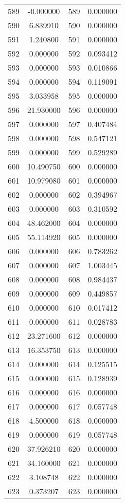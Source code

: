 \documentclass[12pt]{article}
\begin{document}
\begin{longtable}{@{}cccc@{}}
589 & -0.000000 & 589 & 0.000000 \\
590 & 6.839910 & 590 & 0.000000 \\
591 & 1.240800 & 591 & 0.000000 \\
592 & 0.000000 & 592 & 0.093412 \\
593 & 0.000000 & 593 & 0.010866 \\
594 & 0.000000 & 594 & 0.119091 \\
595 & 3.033958 & 595 & 0.000000 \\
596 & 21.930000 & 596 & 0.000000 \\
597 & 0.000000 & 597 & 0.407484 \\
598 & 0.000000 & 598 & 0.547121 \\
599 & 0.000000 & 599 & 0.529289 \\
600 & 10.490750 & 600 & 0.000000 \\
601 & 10.979080 & 601 & 0.000000 \\
602 & 0.000000 & 602 & 0.394967 \\
603 & 0.000000 & 603 & 0.310592 \\
604 & 48.462000 & 604 & 0.000000 \\
605 & 55.114920 & 605 & 0.000000 \\
606 & 0.000000 & 606 & 0.783262 \\
607 & 0.000000 & 607 & 1.003445 \\
608 & 0.000000 & 608 & 0.984437 \\
609 & 0.000000 & 609 & 0.449857 \\
610 & 0.000000 & 610 & 0.017412 \\
611 & 0.000000 & 611 & 0.028783 \\
612 & 23.271600 & 612 & 0.000000 \\
613 & 16.353750 & 613 & 0.000000 \\
614 & 0.000000 & 614 & 0.125515 \\
615 & 0.000000 & 615 & 0.128939 \\
616 & 0.000000 & 616 & 0.000000 \\
617 & 0.000000 & 617 & 0.057748 \\
618 & 4.500000 & 618 & 0.000000 \\
619 & 0.000000 & 619 & 0.057748 \\
620 & 37.926210 & 620 & 0.000000 \\
621 & 34.160000 & 621 & 0.000000 \\
622 & 3.108748 & 622 & 0.000000 \\
623 & 0.373207 & 623 & 0.000000 \\

\end{longtable}
\end{document}
